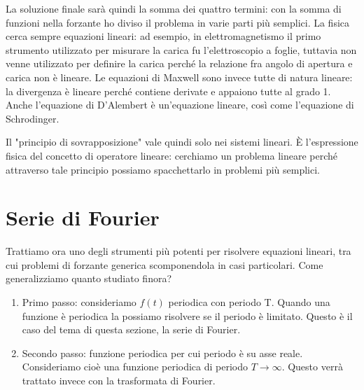 La soluzione finale sarà quindi la somma dei quattro termini: con la somma di funzioni nella forzante ho diviso il problema in varie parti più semplici. La fisica cerca sempre equazioni lineari: ad esempio, in elettromagnetismo il primo strumento utilizzato per misurare la carica fu l'elettroscopio a foglie, tuttavia non venne utilizzato per definire la carica perché la relazione fra angolo di apertura e carica non è lineare. Le equazioni di Maxwell sono invece tutte di natura lineare: la divergenza è lineare perché contiene derivate e appaiono tutte al grado 1. Anche l'equazione di D'Alembert è un'equazione lineare, così come l'equazione di Schrodinger.

Il "principio di sovrapposizione" vale quindi solo nei sistemi lineari. È l'espressione fisica del concetto di operatore lineare: cerchiamo un problema lineare perché attraverso tale principio possiamo spacchettarlo in problemi più semplici.

\section{Serie di Fourier}

Trattiamo ora uno degli strumenti più potenti per risolvere equazioni lineari, tra cui problemi di forzante generica scomponendola in casi particolari. Come generalizziamo quanto studiato finora?
\begin{enumerate}
	
	\item Primo passo: consideriamo \(f(t)\) periodica con periodo T. Quando una funzione è periodica la possiamo risolvere se il periodo è limitato. Questo è il caso del tema di questa sezione, la serie di Fourier.
	\item Secondo passo: funzione periodica per cui periodo è su asse reale. Consideriamo cioè una funzione periodica di periodo \(T \to \infty \). Questo verrà trattato invece con la trasformata di Fourier. 
\end{enumerate}

